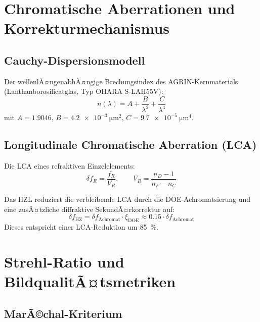 ﻿\documentclass[12pt,a4paper]{article}
\theoremstyle{definition}
\newcommand{\HZ}{\mathrm{HZ}}
\begin{document}
	\section{Chromatische Aberrationen und Korrekturmechanismus}
	
	\subsection{Cauchy-Dispersionsmodell}
	
	Der wellenlÃ¤ngenabhÃ¤ngige Brechungsindex des AGRIN-Kernmaterials
	(Lanthanborosilicatglas, Typ OHARA S-LAH55V):
	\begin{equation}
		n(\lambda) = A + \frac{B}{\lambda^2} + \frac{C}{\lambda^4}
		\label{eq:cauchy}
	\end{equation}
	mit $A = 1.9046$, $B = \SI{4.2e-3}{\micro\metre^2}$,
	$C = \SI{9.7e-5}{\micro\metre^4}$.
	
	\subsection{Longitudinale Chromatische Aberration (LCA)}
	
	Die LCA eines refraktiven Einzelelements:
	\begin{equation}
		\delta f_R = \frac{f_R}{V_R},
		\qquad
		V_R = \frac{n_D - 1}{n_F - n_C}
		\label{eq:lca}
	\end{equation}
	
	Das HZL reduziert die verbleibende LCA durch die DOE-Achromatsierung
	und eine zusÃ¤tzliche diffraktive SekundÃ¤rkorrektur auf:
	\begin{equation}
		\delta f_\HZ = \delta f_\mathrm{Achromat}\cdot\xi_\mathrm{DOE}
		\approx 0.15\cdot\delta f_\mathrm{Achromat}
		\label{eq:lca_hz}
	\end{equation}
	Dieses entspricht einer LCA-Reduktion um \SI{85}{\percent}.
	
	\section{Strehl-Ratio und BildqualitÃ¤tsmetriken}
	
	\subsection{MarÃ©chal-Kriterium}
	
\end{document}
